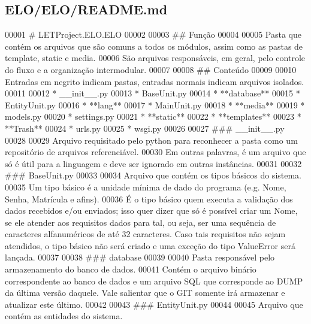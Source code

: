 \hypertarget{ELO_2ELO_2README_8md_source}{\subsection{E\-L\-O/\-E\-L\-O/\-R\-E\-A\-D\-M\-E.md}
}

\begin{DoxyCode}
00001 \textcolor{preprocessor}{# LETProject.ELO.ELO}
00002 \textcolor{preprocessor}{}
00003 \textcolor{preprocessor}{## Função}
00004 \textcolor{preprocessor}{}
00005 Pasta que contém os arquivos que são comuns a todos os módulos, assim como as pastas de \textcolor{keyword}{template}, \textcolor{keyword}{static} e 
      media.
00006 São arquivos responsáveis, em geral, pelo controle \textcolor{keywordflow}{do} fluxo e a organização intermodular.
00007 
00008 ## Conteúdo
00009 
00010 Entradas em negrito indicam pastas, entradas normais indicam arquivos isolados.
00011 
00012 * \_\_init\_\_.py
00013 * BaseUnit.py
00014 * **database**
00015 * EntityUnit.py
00016 * **lang**
00017 * MainUnit.py
00018 * **media**
00019 * models.py
00020 * settings.py
00021 * **\textcolor{keyword}{static}**
00022 * **templates**
00023 * **Trash**
00024 * urls.py
00025 * wsgi.py
00026 
00027 \textcolor{preprocessor}{### \_\_init\_\_.py}
00028 \textcolor{preprocessor}{}
00029 Arquivo requisitado pelo python para reconhecer a pasta como um repositório de arquivos referenciável.
00030 Em outras palavras, é um arquivo que só é útil para a linguagem e deve ser ignorado em outras instâncias.
00031 
00032 ### BaseUnit.py
00033 
00034 Arquivo que contém os tipos básicos \textcolor{keywordflow}{do} sistema.
00035 Um tipo básico é a unidade mínima de dado \textcolor{keywordflow}{do} programa (e.g. Nome, Senha, Matrícula e afins). 
00036 É o tipo básico quem executa a validação dos dados recebidos e/ou enviados; isso quer dizer que só é 
      possível criar um Nome, se ele atender aos requisitos dados para tal, ou seja, ser uma sequência de caracteres 
      alfanuméricos de até 32 caracteres. Caso tais requisitos não sejam atendidos, o tipo básico não será criado e 
      uma exceção \textcolor{keywordflow}{do} tipo ValueError será lançada.
00037 
00038 ### database
00039 
00040 Pasta responsável pelo armazenamento \textcolor{keywordflow}{do} banco de dados.
00041 Contém o arquivo binário correspondente ao banco de dados e um arquivo SQL que corresponde ao DUMP da 
      última versão daquele. Vale salientar que o GIT somente irá armazenar e atualizar este último.
00042 
00043 ### EntityUnit.py
00044 
00045 Arquivo que contém as entidades \textcolor{keywordflow}{do} sistema.

\end{DoxyCode}
